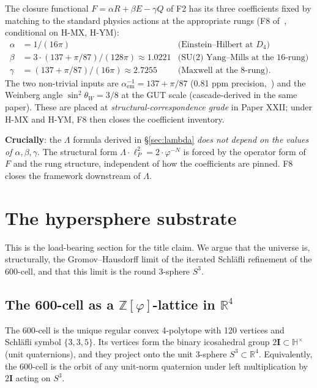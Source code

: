 \documentclass[11pt]{article}
\theoremstyle{plain}
\theoremstyle{definition}
\theoremstyle{remark}
\newcommand{\Zphi}{\mathbb{Z}[\varphi]}
\newcommand{\twoI}{2\mathbf{I}}
\begin{document}
The closure functional $F = \alpha R + \beta E - \gamma Q$ of F2 has its three coefficients fixed by matching to the standard physics actions at the appropriate rungs (F8 of~\citealp{SmartXXXVI}, conditional on H-MX, H-YM):
\begin{align*}
  \alpha &= 1/(16\pi)             & \text{(Einstein--Hilbert at $D_4$)} \\
  \beta  &= 3 \cdot (137 + \pi/87) / (128\pi) \approx 1.0221 & \text{(SU(2) Yang--Mills at the 16-rung)} \\
  \gamma &= (137 + \pi/87) / (16\pi) \approx 2.7255 & \text{(Maxwell at the 8-rung)}.
\end{align*}
The two non-trivial inputs are $\alpha_\mathrm{em}^{-1} = 137 + \pi/87$ (0.81 ppm precision,~\citealp{SmartXXII}) and the Weinberg angle $\sin^2 \theta_W = 3/8$ at the GUT scale (cascade-derived in the same paper). These are placed at \emph{structural-correspondence grade} in Paper XXII; under H-MX and H-YM, F8 then closes the coefficient inventory.

\smallskip\noindent\textbf{Crucially}: the $\Lambda$ formula derived in \S\ref{sec:lambda} \emph{does not depend on the values of $\alpha, \beta, \gamma$}. The structural form $\Lambda \cdot \ell_P^2 = 2 \cdot \varphi^{-N}$ is forced by the operator form of $F$ and the rung structure, independent of how the coefficients are pinned. F8 closes the framework downstream of $\Lambda$.

\section{The hypersphere substrate}\label{sec:hypersphere}

This is the load-bearing section for the title claim. We argue that the universe is, structurally, the Gromov--Hausdorff limit of the iterated Schl\"afli refinement of the 600-cell, and that this limit is the round 3-sphere $S^3$.

\subsection{The 600-cell as a $\Zphi$-lattice in $\mathbb{R}^4$}

The 600-cell is the unique regular convex 4-polytope with 120 vertices and Schl\"afli symbol $\{3, 3, 5\}$. Its vertices form the binary icosahedral group $\twoI \subset \mathbb{H}^\times$ (unit quaternions), and they project onto the unit 3-sphere $S^3 \subset \mathbb{R}^4$. Equivalently, the 600-cell is the orbit of any unit-norm quaternion under left multiplication by $\twoI$ acting on $S^3$.
\end{document}
